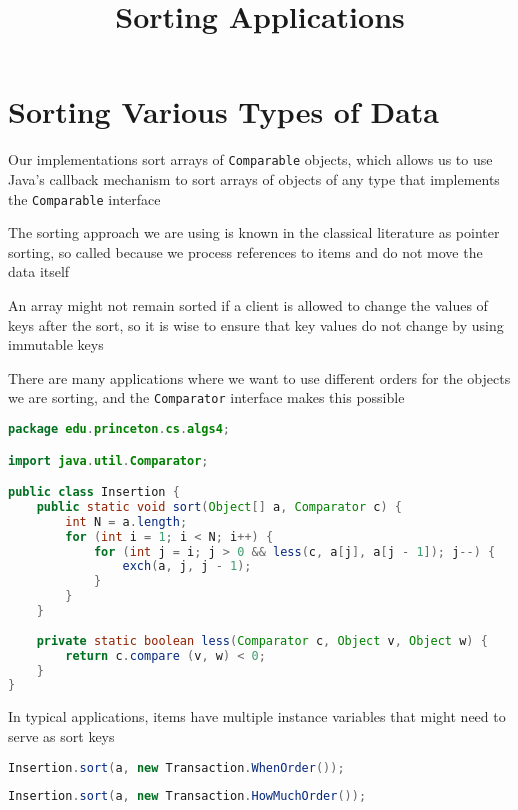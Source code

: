\documentclass[8pt,a4paper,compress]{beamer}
\title{Sorting Applications}
\date{}
\begin{document}
\begin{frame}
\vfill
\titlepage
\end{frame}

\section{Sorting Various Types of Data}
\begin{frame}[fragile]
\pause

Our implementations sort arrays of \lstinline$Comparable$ objects, which allows us to use Java's callback mechanism to sort arrays of objects of any type that implements the \lstinline$Comparable$ interface

\pause
\bigskip

The sorting approach we are using is known in the classical literature as pointer sorting, so called because we process references to items and do not move the data itself

\pause
\bigskip

An array might not remain sorted if a client is allowed to change the values of keys after the sort, so it is wise to ensure that key values do not change by using immutable keys
\end{frame}

\begin{frame}[fragile]
\pause

There are many applications where we want to use different orders for the objects we are sorting, and the \lstinline$Comparator$ interface makes this possible

\smallskip

\begin{lstlisting}[language=Java,style=focusin]
package edu.princeton.cs.algs4;

import java.util.Comparator;

public class Insertion {
    public static void sort(Object[] a, Comparator c) {
        int N = a.length;
        for (int i = 1; i < N; i++) {
            for (int j = i; j > 0 && less(c, a[j], a[j - 1]); j--) {
                exch(a, j, j - 1);
            }
        }
    }
    
    private static boolean less(Comparator c, Object v, Object w) {     
        return c.compare (v, w) < 0; 
    }
}
\end{lstlisting}

\pause
\bigskip

In typical applications, items have multiple instance variables that might need to serve as sort keys

\smallskip

\begin{lstlisting}[language=Java,style=focusin]
Insertion.sort(a, new Transaction.WhenOrder());
\end{lstlisting}

\smallskip

\begin{lstlisting}[language=Java,style=focusin]
Insertion.sort(a, new Transaction.HowMuchOrder());
\end{lstlisting}
\end{frame}
\end{document}
